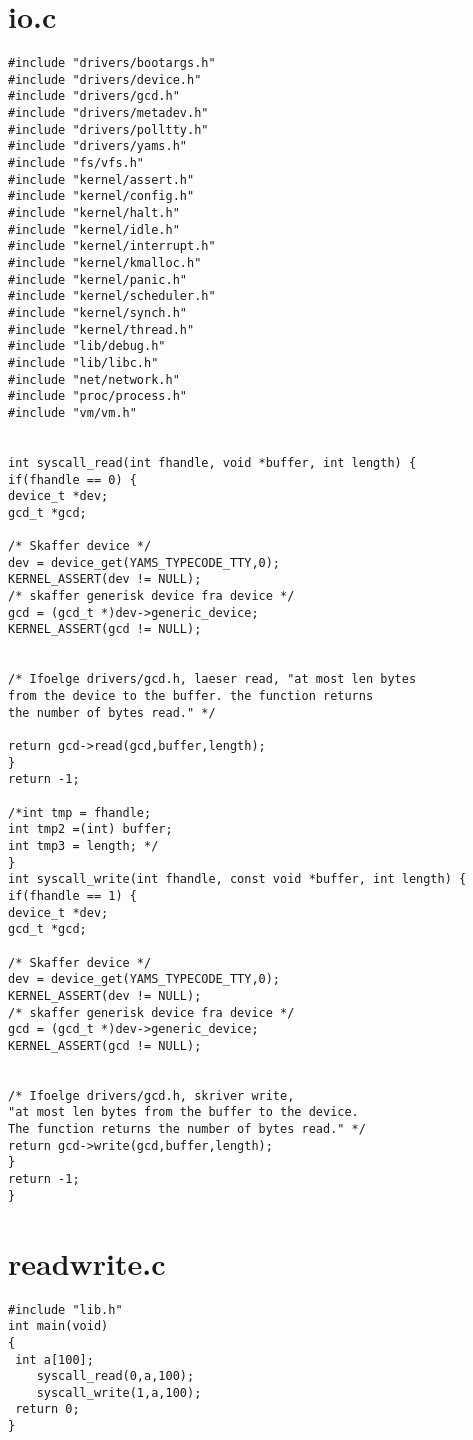 \documentclass[a4paper,12pt]{article}
\begin{document}
\section*{io.c}
\begin{lstlisting}
#include "drivers/bootargs.h"
#include "drivers/device.h"
#include "drivers/gcd.h"
#include "drivers/metadev.h"
#include "drivers/polltty.h"
#include "drivers/yams.h"
#include "fs/vfs.h"
#include "kernel/assert.h"
#include "kernel/config.h"
#include "kernel/halt.h"
#include "kernel/idle.h"
#include "kernel/interrupt.h"
#include "kernel/kmalloc.h"
#include "kernel/panic.h"
#include "kernel/scheduler.h"
#include "kernel/synch.h"
#include "kernel/thread.h"
#include "lib/debug.h"
#include "lib/libc.h"
#include "net/network.h"
#include "proc/process.h"
#include "vm/vm.h"


int syscall_read(int fhandle, void *buffer, int length) {
if(fhandle == 0) {
device_t *dev;
gcd_t *gcd;

/* Skaffer device */
dev = device_get(YAMS_TYPECODE_TTY,0);
KERNEL_ASSERT(dev != NULL);
/* skaffer generisk device fra device */
gcd = (gcd_t *)dev->generic_device;
KERNEL_ASSERT(gcd != NULL);


/* Ifoelge drivers/gcd.h, laeser read, "at most len bytes 
from the device to the buffer. the function returns 
the number of bytes read." */

return gcd->read(gcd,buffer,length);
}
return -1;

/*int tmp = fhandle;
int tmp2 =(int) buffer;
int tmp3 = length; */
}
int syscall_write(int fhandle, const void *buffer, int length) {
if(fhandle == 1) {
device_t *dev;
gcd_t *gcd;

/* Skaffer device */
dev = device_get(YAMS_TYPECODE_TTY,0);
KERNEL_ASSERT(dev != NULL);
/* skaffer generisk device fra device */
gcd = (gcd_t *)dev->generic_device;
KERNEL_ASSERT(gcd != NULL);


/* Ifoelge drivers/gcd.h, skriver write, 
"at most len bytes from the buffer to the device. 
The function returns the number of bytes read." */
return gcd->write(gcd,buffer,length);
}
return -1;
}
\end{lstlisting}
\newpage

\section*{readwrite.c}
\begin{lstlisting}
#include "lib.h"
int main(void)
{
 int a[100];
    syscall_read(0,a,100); 
    syscall_write(1,a,100);
 return 0;
}
\end{lstlisting}
\end{document}

